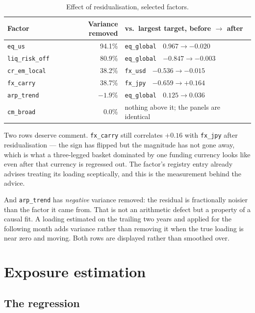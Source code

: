 \documentclass[11pt,a4paper]{article}
\newcommand{\code}[1]{\texttt{\small #1}}
\begin{document}
\begin{table}[htbp]
\centering
\caption{Effect of residualisation, selected factors.}
\label{tab:sidebyside}
\small
\begin{tabular}{@{}lrl@{}}
\toprule
\textbf{Factor} & \textbf{Variance removed} & \textbf{vs.\ largest target, before $\rightarrow$ after} \\
\midrule
\code{eq\_us}        & 94.1\% & \code{eq\_global} $\;$ $0.967 \rightarrow -0.020$ \\
\code{liq\_risk\_off}& 80.9\% & \code{eq\_global} $\;$ $-0.847 \rightarrow -0.003$ \\
\code{cr\_em\_local} & 38.2\% & \code{fx\_usd} $\;$ $-0.536 \rightarrow -0.015$ \\
\code{fx\_carry}     & 38.7\% & \code{fx\_jpy} $\;$ $-0.659 \rightarrow \mathbf{+0.164}$ \\
\code{arp\_trend}    & $-1.9$\% & \code{eq\_global} $\;$ $0.125 \rightarrow 0.036$ \\
\code{cm\_broad}     & 0.0\% & nothing above it; the panels are identical \\
\bottomrule
\end{tabular}
\end{table}

Two rows deserve comment. \code{fx\_carry} still correlates $+0.16$ with
\code{fx\_jpy} after residualisation --- the sign has flipped but the magnitude has
not gone away, which is what a three-legged basket dominated by one funding currency
looks like even after that currency is regressed out. The factor's registry entry
already advises treating its loading sceptically, and this is the measurement behind
the advice.

And \code{arp\_trend} has \emph{negative} variance removed: the residual is
fractionally noisier than the factor it came from. That is not an arithmetic defect
but a property of a causal fit. A loading estimated on the trailing two years and
applied for the following month adds variance rather than removing it when the true
loading is near zero and moving. Both rows are displayed rather than smoothed over.

\section{Exposure estimation}
\label{sec:estimation}

\subsection{The regression}
\end{document}
